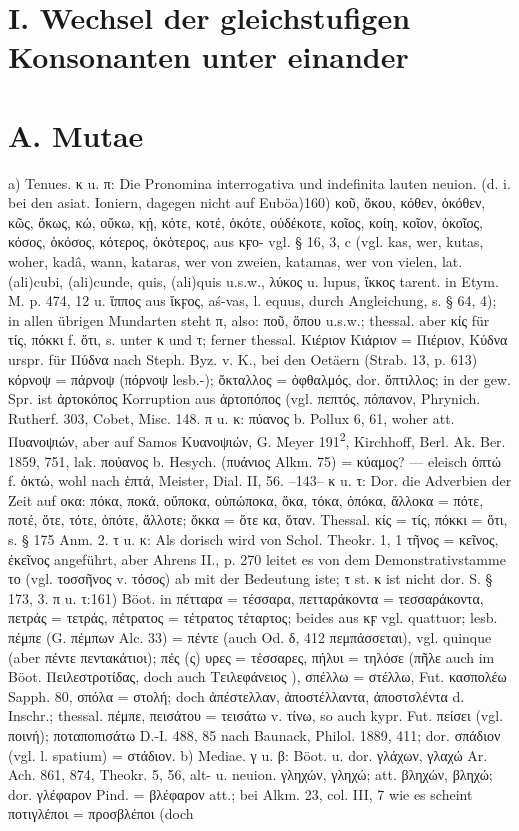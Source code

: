 \section*{I. Wechsel der gleichstufigen Konsonanten unter einander}
\section{A. Mutae}

a) Tenues. κ u. π: Die Pronomina interrogativa und indefinita lauten neuion. (d. i. bei den asiat. Ioniern, dagegen nicht auf Euböa)160) κοῦ, ὅκου, κόθεν, ὁκόθεν, κῶς, ὅκως, κώ, οὔκω, κῄ, κότε, κοτέ, ὁκότε, οὐδέκοτε, κοῖος, κοίη, κοῖον, ὁκοῖος, κόσος, ὁκόσος, κότερος, ὁκὁτερος, aus κϝο- vgl. § 16, 3, c (vgl. kas, wer, kutas, woher, kadâ, wann, kataras, wer von zweien, katamas, wer von vielen, lat. (ali)cubi, (ali)cunde, quis, (ali)quis u.s.w., λύκος u. lupus, ἴκκος tarent. in Etym. M. p. 474, 12 u. ἵππος aus ἴκϝος, aś-vas, l. equus, durch Angleichung, s. § 64, 4); in allen übrigen Mundarten steht π, also: ποῦ, ὅπου u.s.w.; thessal. aber κίς für τίς, πόκκι f. ὅτι, s. unter κ und τ; ferner thessal. Κιέριον Κιάριον = Πιέριον, Κύδνα urspr. für Πύδνα nach Steph. Byz. v. K., bei den Oetäern (Strab. 13, p. 613) κόρνοψ = πάρνοψ (πόρνοψ lesb.-);  ὄκταλλος = ὀφθαλμός, dor. ὄπτιλλος; in der gew. Spr. ist ἀρτοκόπος Korruption aus ἀρτοπόπος (vgl. πεπτός, πόπανον, Phrynich. Rutherf. 303, Cobet, Misc. 148. π u. κ: πύανος b. Pollux 6, 61, woher att. Πυανοψιών, aber auf Samos Κυανοψιών, G. Meyer 191\textsuperscript{2}, Kirchhoff, Berl. Ak. Ber. 1859, 751, lak. πούανος b. Hesych. (πυάνιος Alkm. 75) = κύαμος? — eleisch ὀπτώ f. ὀκτώ, wohl nach ἑπτά, Meister, Dial. II, 56. --143-- κ u. τ: Dor. die Adverbien der Zeit auf οκα: πόκα, ποκά, οὔποκα, οὐπώποκα, ὅκα, τόκα, ὁπόκα, ἄλλοκα = πότε, ποτέ, ὅτε, τότε, ὁπότε, ἄλλοτε; ὅκκα = ὅτε κα, ὅταν. Thessal. κίς = τίς, πόκκι = ὅτι, s. § 175 Anm. 2. τ u. κ: Als dorisch wird von Schol. Theokr. 1, 1 τῆνος = κεῖνος, ἐκεῖνος angeführt, aber Ahrens II., p. 270 leitet es von dem Demonstrativstamme το (vgl. τοσσῆνος v. τόσος) ab mit der Bedeutung iste; τ st. κ ist nicht dor. S. § 173, 3. π u. τ:161) Böot. in πέτταρα = τέσσαρα, πετταράκοντα = τεσσαράκοντα, πετράς = τετράς, πέτρατος = τέτρατος τέταρτος; beides aus κϝ vgl. quattuor; lesb. πέμπε (G. πέμπων Alc. 33) = πέντε (auch Od. δ, 412 πεμπάσσεται), vgl. quinque (aber  πέντε πεντακάτιοι); πές (ς) υρες = τέσσαρες, πήλυι = τηλόσε (πῆλε auch im Böot. Πειλεστροτίδας, doch auch Τειλεφάνειος ), σπέλλω = στέλλω, Fut. κασπολέω Sapph. 80, σπόλα = στολή; doch ἀπέστελλαν, ἀποστέλλαντα, ἀποστσλέντα d. Inschr.; thessal. πέμπε, πεισάτου = τεισάτω v. τίνω, so auch kypr. Fut. πείσει (vgl. ποινή);  ποταποπισάτω D.-I. 488, 85 nach Baunack, Philol. 1889, 411; dor. σπάδιον (vgl. l. spatium) = στάδιον. b) Mediae. γ u. β: Böot. u. dor. γλάχων, γλαχώ Ar. Ach. 861, 874, Theokr. 5, 56, alt- u. neuion. γληχών, γληχώ; att. βληχών, βληχώ; dor. γλέφαρον Pind. = βλέφαρον att.; bei Alkm. 23, col. III, 7 wie es scheint ποτιγλέποι = προσβλέποι (doch 